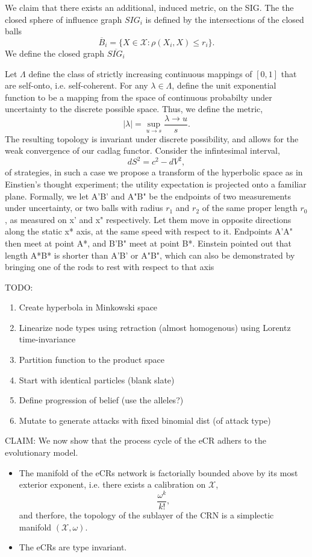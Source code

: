 \documentclass[10pt]{article}
\newcommand{\mcX}{\mathcal{X}}
\theoremstyle{definition}
\begin{document}
We claim that there exists an additional, induced metric, on the
SIG. The the closed sphere of influence graph $SIG_i$ is defined by the intersections of the closed balls
$$
\overline{B}_i= \lbrace X \in \mcX : \rho(X_i, X) \le r_i\rbrace.
$$
We define the closed graph $\overline{SIG_i}$ 

Let $\Lambda$ define the class of strictly increasing continuous mappings of
$[0,1]$ that are self-onto, i.e. self-coherent. For any $\lambda \in \Lambda$,
define the unit exponential function to be a mapping from the space of
continuous probabilty under uncertainty to the discrete possible space. Thus, we
define the metric, 
$$
\vert \lambda \vert = \sup \limits_{u\rightarrow s}\frac{\lambda\rightarrow u}{s}.
$$
The resulting topology is invariant under discrete possibility, and allows for
the weak convergence of our cadlag functor. Consider the infintesimal interval, 
$$
dS^2 = c^2 - dV^2,
$$
of strategies, in such a case we propose a transform of the hyperbolic space as
in Einstien's thought experiment; the utility expectation is projected
onto a familiar plane. Formally, we let A'B' and A"B" be the endpoints of two
measurements under uncertainty, or two balls with radius $r_1$ and $r_2$ of the
same proper length $r_0$, as measured on x' and x" respectively. Let them move
in opposite directions along the static x* axis, at the same speed with respect to it. Endpoints A'A" then meet at point A*, and B'B" meet at point B*. Einstein pointed out that length A*B* is shorter than A'B' or A"B", which can also be demonstrated by bringing one of the rods to rest with respect to that axis

TODO:
\begin{enumerate}
\item Create hyperbola in Minkowski space
\item Linearize node types using retraction (almost homogenous) using Lorentz
time-invariance 
\item Partition function to the product space
\item Start with identical particles (blank slate)
\item Define progression of belief (use the alleles?)
\item Mutate to generate attacks with fixed binomial dist (of attack type)
\end{enumerate}


CLAIM: We now show that the process cycle of the eCR adhers to the evolutionary
model.
\begin{itemize}
\item The manifold of the eCRs network is factorially bounded above by its
most exterior exponent, i.e. there exists a calibration on $\mcX$,
$$
\frac{\omega^k}{k!},
$$    
and therfore, the topology of the sublayer of the CRN is a simplectic
manifold $(\mcX,\omega)$. 
\item The eCRs are type invariant.
\end{itemize}
\end{document}
